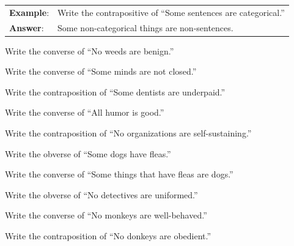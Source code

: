 \begin{longtabu}{p{.1\linewidth}p{.9\linewidth}}
\textbf{Example}: & Write the contrapositive of ``Some sentences are categorical.''\\
\textbf{Answer}: & Some non-categorical things are non-sentences. \\
\end{longtabu}

\begin{exercises}
\item Write the converse of ``No weeds are benign.''

\item Write the converse of ``Some minds are not closed.''

\item Write the contraposition of ``Some dentists are underpaid.''

\item Write the converse of ``All humor is good.''

\item Write the contraposition of ``No organizations are self-sustaining.''

\item Write the obverse of ``Some dogs have fleas.''

\item Write the converse of ``Some things that have fleas are dogs.''

\item Write the obverse of ``No detectives are uniformed.''

\item Write the converse of ``No monkeys are well-behaved.''

\item Write the contraposition of ``No donkeys are obedient.''

\end{exercises}

